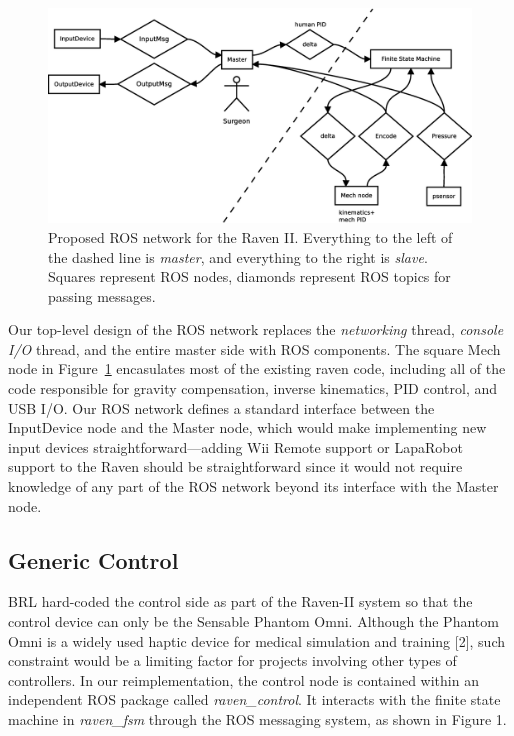 \documentclass[letterpaper,twocolumn,10pt]{article}
\begin{document}
\begin{figure}[ht!]
  \begin{center}
    \includegraphics[width=1.0\textwidth]{ros_high_level_v2.eps}
  \end{center}
  \caption{Proposed ROS network for the Raven II. Everything to the
    left of the dashed line is \emph{master}, and everything to the
    right is \emph{slave}. Squares represent ROS nodes, diamonds
    represent ROS topics for passing messages.}
  \label{fig:ros_network}
\end{figure}

Our top-level design of the ROS network replaces the \emph{networking}
thread, \emph{console I/O} thread, and the entire master side with ROS
components. The square Mech node in Figure~\ref{fig:ros_network}
encasulates most of the existing raven code, including all of the code
responsible for gravity compensation, inverse kinematics, PID control,
and USB I/O. Our ROS network defines a standard interface between the
InputDevice node and the Master node, which would make implementing
new input devices straightforward---adding Wii Remote support or
LapaRobot support to the Raven should be straightforward since it
would not require knowledge of any part of the ROS network beyond its
interface with the Master node.

\subsection{Generic Control}

BRL hard-coded the control side as part of the Raven-II system so that
the control device can only be the Sensable Phantom Omni. Although the
Phantom Omni is a widely used haptic device for medical simulation and
training [2], such constraint would be a limiting factor for projects
involving other types of controllers. In our reimplementation, the
control node is contained within an independent ROS package called
{\it raven\_control}. It interacts with the finite state machine in
{\it raven\_fsm} through the ROS messaging system, as shown in Figure
1.
\end{document}

